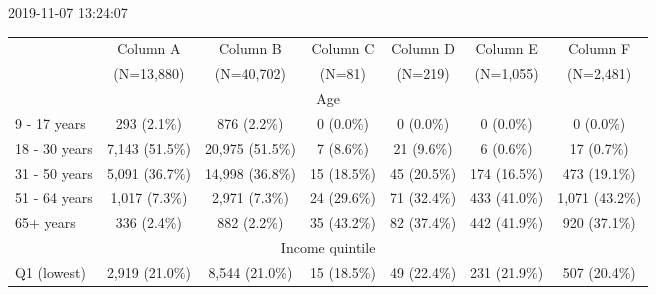 \documentclass{article}
\begin{document}
2019-11-07 13:24:07

\begin{table}[htbp]
\centering
\setlength{\tabcolsep}{0.5em}
\def\arraystretch{1.5}  
\caption{Some kind of numbers}
\begin{longtable}{l*{6}{c}}
\toprule
\multirow{2}{*}{}&     Column A     &  Column B  &     Column C    &  Column D &      Column E     &   Column F  \\
                                                        &           (N=13,880)           &           (N=40,702)           &             (N=81)             &             (N=219)            &            (N=1,055)           &            (N=2,481)           \\
\multicolumn{7}{c}{Age                                                     }\\
  9 - 17 years                                          &           293 (2.1\%)           &           876 (2.2\%)           &            0 (0.0\%)            &            0 (0.0\%)            &            0 (0.0\%)            &            0 (0.0\%)            \\
  18 - 30 years                                         &          7,143 (51.5\%)         &         20,975 (51.5\%)         &            7 (8.6\%)            &            21 (9.6\%)           &            6 (0.6\%)            &            17 (0.7\%)           \\
  31 - 50 years                                         &          5,091 (36.7\%)         &         14,998 (36.8\%)         &           15 (18.5\%)           &           45 (20.5\%)           &           174 (16.5\%)          &           473 (19.1\%)          \\
  51 - 64 years                                         &          1,017 (7.3\%)          &          2,971 (7.3\%)          &           24 (29.6\%)           &           71 (32.4\%)           &           433 (41.0\%)          &          1,071 (43.2\%)         \\
  65+ years                                             &           336 (2.4\%)           &           882 (2.2\%)           &           35 (43.2\%)           &           82 (37.4\%)           &           442 (41.9\%)          &           920 (37.1\%)          \\
\multicolumn{7}{c}{Income quintile                                         }\\
  Q1 (lowest)                                           &          2,919 (21.0\%)         &          8,544 (21.0\%)         &           15 (18.5\%)           &           49 (22.4\%)           &           231 (21.9\%)          &           507 (20.4\%)          \\

\end{longtable}
\end{table}
\end{document}
